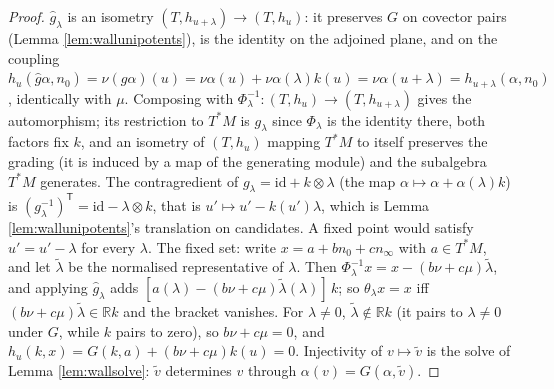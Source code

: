 \documentclass[11pt]{article}
\theoremstyle{definition}
\newcommand{\R}{\mathbb{R}}
\newcommand{\id}{\mathrm{id}}
\newcommand{\nO}{n_0}
\newcommand{\nInf}{n_\infty}
\begin{document}
\begin{proof}
$\hat g_\lambda$ is an isometry $(T, h_{u+\lambda}) \to (T, h_u)$: it preserves $G$ on covector pairs (Lemma \ref{lem:wallunipotents}), is the identity on the adjoined plane, and on the coupling $h_u(\hat g\alpha, \nO) = \nu(g\alpha)(u) = \nu\alpha(u) + \nu\alpha(\lambda)k(u) = \nu\alpha(u+\lambda) = h_{u+\lambda}(\alpha, \nO)$, identically with $\mu$. Composing with $\Phi_\lambda^{-1} : (T, h_u) \to (T, h_{u+\lambda})$ gives the automorphism; its restriction to $T^*M$ is $g_\lambda$ since $\Phi_\lambda$ is the identity there, both factors fix $k$, and an isometry of $(T, h_u)$ mapping $T^*M$ to itself preserves the grading (it is induced by a map of the generating module) and the subalgebra $T^*M$ generates. The contragredient of $g_\lambda = \id + k \otimes \lambda$ (the map $\alpha \mapsto \alpha + \alpha(\lambda)k$) is $(g_\lambda^{-1})^{\mathsf{T}} = \id - \lambda \otimes k$, that is $u' \mapsto u' - k(u')\lambda$, which is Lemma \ref{lem:wallunipotents}'s translation on candidates. A fixed point would satisfy $u' = u' - \lambda$ for every $\lambda$. The fixed set: write $x = a + b\nO + c\nInf$ with $a \in T^*M$, and let $\tilde\lambda$ be the normalised representative of $\lambda$. Then $\Phi_\lambda^{-1}x = x - (b\nu + c\mu)\tilde\lambda$, and applying $\hat g_\lambda$ adds $[a(\lambda) - (b\nu + c\mu)\tilde\lambda(\lambda)]\,k$; so $\theta_\lambda x = x$ iff $(b\nu + c\mu)\tilde\lambda \in \R k$ and the bracket vanishes. For $\lambda \neq 0$, $\tilde\lambda \notin \R k$ (it pairs to $\lambda \neq 0$ under $G$, while $k$ pairs to zero), so $b\nu + c\mu = 0$, and $h_u(k, x) = G(k, a) + (b\nu + c\mu)k(u) = 0$. Injectivity of $v \mapsto \tilde v$ is the solve of Lemma \ref{lem:wallsolve}: $\tilde v$ determines $v$ through $\alpha(v) = G(\alpha, \tilde v)$.
\end{proof}
\end{document}
